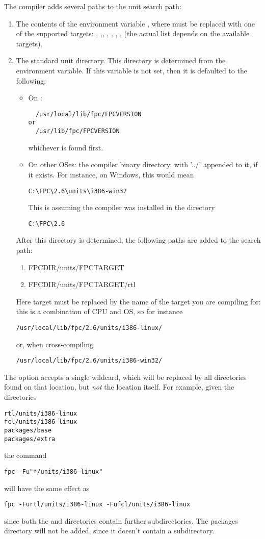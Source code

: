 The compiler adds several paths to the unit search path:
\begin{enumerate}
\item The contents of the environment variable , where 
must be replaced with one of the supported targets: ,
,, , , , ,
 (the actual list depends on the available targets).
\item The standard unit directory. This directory is determined
from the  environment variable. If this variable is not set,
then it is defaulted to the following:
\begin{itemize}
\item On \linux:
\begin{verbatim}
  /usr/local/lib/fpc/FPCVERSION
or
  /usr/lib/fpc/FPCVERSION
\end{verbatim}
whichever is found first.
\item On other OSes: the compiler binary directory, with '../' appended
to it, if it exists. For instance, on Windows, this would mean
\begin{verbatim}
C:\FPC\2.6\units\i386-win32
\end{verbatim}
This is assuming the compiler was installed in the directory
\begin{verbatim}
C:\FPC\2.6
\end{verbatim}
\end{itemize}
After this directory is determined, the following paths are added to the
search path:
\begin{enumerate}
\item FPCDIR/units/FPCTARGET
\item FPCDIR/units/FPCTARGET/rtl
\end{enumerate}
Here target must be replaced by the name of the target you are compiling
for: this is a combination of CPU and OS, so for instance
\begin{verbatim}
/usr/local/lib/fpc/2.6/units/i386-linux/
\end{verbatim}
or, when cross-compiling
\begin{verbatim}
/usr/local/lib/fpc/2.6/units/i386-win32/
\end{verbatim}
\end{enumerate}

The  option accepts a single \var{*} wildcard, which will be
replaced by all directories found on that location, but {\em not} the
location itself.
For example, given the directories
\begin{verbatim}
rtl/units/i386-linux
fcl/units/i386-linux
packages/base
packages/extra
\end{verbatim}
the command
\begin{verbatim}
fpc -Fu"*/units/i386-linux"
\end{verbatim}
will have the same effect as
\begin{verbatim}
fpc -Furtl/units/i386-linux -Fufcl/units/i386-linux
\end{verbatim}
since both the  and  directories contain further
 subdirectories. The packages directory will not be
added, since it doesn't contain a  subdirectory.

